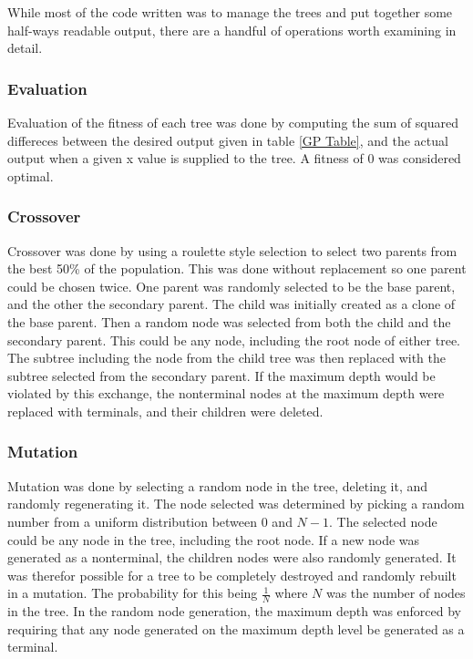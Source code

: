 While most of the code written was to manage the trees and put together some half-ways readable output, there are a handful of operations worth examining in detail.

\subsubsection{Evaluation}

Evaluation of the fitness of each tree was done by computing the sum of squared differeces between the desired output given in table \ref{GP Table}, and the actual output when a given x value is supplied to the tree. A fitness of 0 was considered optimal.

\subsubsection{Crossover}

Crossover was done by using a roulette style selection to select two parents from the best 50\% of the population. This was done without replacement so one parent could be chosen twice. One parent was randomly selected to be the base parent, and the other the secondary parent. The child was initially created as a clone of the base parent. Then a random node was selected from both the child and the secondary parent. This could be any node, including the root node of either tree. The subtree including the node from the child tree was then replaced with the subtree selected from the secondary parent. If the maximum depth would be violated by this exchange, the nonterminal nodes at the maximum depth were replaced with terminals, and their children were deleted.

\subsubsection{Mutation}

Mutation was done by selecting a random node in the tree, deleting it, and randomly regenerating it. The node selected was determined by picking a random number from a uniform distribution between 0 and $N-1$. The selected node could be any node in the tree, including the root node. If a new node was generated as a nonterminal, the children nodes were also randomly generated. It was therefor possible for a tree to be completely destroyed and randomly rebuilt in a mutation. The probability for this being $\frac{1}{N}$ where $N$ was the number of nodes in the tree. In the random node generation, the maximum depth was enforced by requiring that any node generated on the maximum depth level be generated as a terminal.

